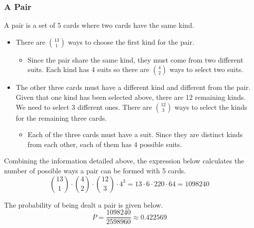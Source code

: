 \subsubsection*{A Pair}
A pair is a set of 5 cards where two cards have the same kind. 
\begin{itemize}
    \item There are $\binom{13}{1}$ ways to choose the first kind for the pair.
    \begin{itemize}
        \item Since the pair share the same kind, they must come from two different suits.  Each kind has 4 suits so there are $\binom{4}{2}$ ways to select two suits.
    \end{itemize}
    \item The other three cards must have a different kind and different from the pair.  Given that one kind has been selected above, there are 12 remaining kinds.  We need to select 3 different ones.  There are $\binom{12}{3}$ ways to select the kinds for the remaining three cards.
    \begin{itemize}
        \item Each of the three cards must have a suit.  Since they are distinct kinds from each other, each of them has 4 possible suits. 
    \end{itemize}    
\end{itemize}
Combining the information detailed above, the expression below calculates the number of possible ways a pair can be formed with 5 cards.
$$\binom{13}{1} \cdot \binom{4}{2} \cdot \binom{12}{3} \cdot 4^3 = 13 \cdot 6 \cdot 220 \cdot 64 = 1098240$$

The probability of being dealt a pair is given below.
$$P = \frac{1098240}{2598960} \approx 0.422569$$

